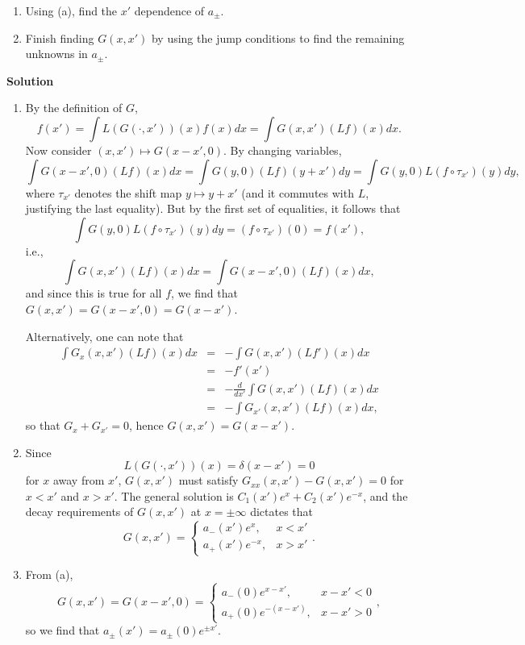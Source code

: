 \documentclass{article}
\begin{document}
\begin{enumerate}
\begin{enumerate}
\item Using (a), find the \(x'\) dependence of \(a_{\pm}\).

\item Finish finding \(G(x,x')\) by using the jump conditions to find the remaining unknowns in \(a_{\pm}\).

\end{enumerate}

{\bf Solution}

\begin{enumerate}
\item By the definition of \(G\),
\[f(x') = \int L(G(\cdot,x'))(x) f(x) dx = \int G(x,x') (Lf)(x) dx.\]
Now consider \((x,x') \mapsto G(x - x',0)\).  By changing variables,
\[\int G(x - x',0) (Lf)(x) dx = \int G(y,0) (Lf)(y + x') dy = \int G(y,0) L(f \circ \tau_{x'})(y) dy,\]
where \(\tau_{x'}\) denotes the shift map \(y \mapsto y + x'\) (and it commutes with \(L\), justifying the last equality).  But by the first set of equalities, it follows that
\[\int G(y,0) L(f \circ \tau_{x'})(y) dy = (f \circ \tau_{x'})(0) = f(x'),\]
i.e.,
\[\int G(x,x') (Lf)(x) dx = \int G(x - x',0) (Lf)(x) dx,\]
and since this is true for all \(f\), we find that \(G(x,x') = G(x - x',0) = G(x - x')\).

Alternatively, one can note that
\begin{eqnarray*}
\int G_x(x,x') (Lf)(x) dx
& = & -\int G(x,x') (Lf')(x) dx \\
& = & -f'(x') \\
& = & -\frac{d}{dx'} \int G(x,x') (Lf)(x) dx \\
& = & -\int G_{x'}(x,x') (Lf)(x) dx,
\end{eqnarray*}
so that \(G_x + G_{x'} = 0\), hence \(G(x,x') = G(x - x')\).

\item Since
\[L(G(\cdot,x'))(x) = \delta(x - x') = 0\]
for \(x\) away from \(x'\), \(G(x,x')\) must satisfy \(G_{xx}(x,x') - G(x,x') = 0\) for \(x < x'\) and \(x > x'\).  The general solution is \(C_1(x') e^x + C_2(x') e^{-x}\), and the decay requirements of \(G(x,x')\) at \(x = \pm \infty\) dictates that
\[G(x,x') = \begin{cases} a_-(x') e^x, & x < x' \\ a_+(x') e^{-x}, & x > x' \end{cases}.\]

\item From (a),
\[G(x,x') = G(x - x',0) = \begin{cases} a_-(0) e^{x - x'}, & x - x' < 0 \\ a_+(0) e^{-(x - x')}, & x - x' > 0 \end{cases},\]
so we find that \(a_{\pm}(x') = a_{\pm}(0) e^{\pm x'}\).


\end{enumerate}
\end{enumerate}
\end{document}
